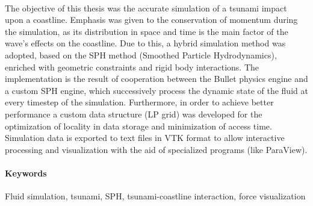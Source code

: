 \paragraph{} The objective of this thesis was the accurate simulation of a tsunami impact
upon a coastline. Emphasis was given to the conservation of momentum during the
simulation, as its distribution in space and time is the main factor of the wave's effects
on the coastline. Due to this, a hybrid simulation method was adopted, based on the SPH
method (Smoothed Particle Hydrodynamics), enriched with geometric constraints and rigid
body interactions. The implementation is the result of cooperation between the Bullet
physics engine and a custom SPH engine, which successively process the dynamic state of
the fluid at every timestep of the simulation. Furthermore, in order to achieve better
performance a custom data structure (LP grid) was developed for the optimization of
locality in data storage and minimization of access time. Simulation data is exported to
text files in VTK format to allow interactive processing and visualization with the aid of
specialized programs (like ParaView).
\paragraph{Keywords} Fluid simulation, tsunami, SPH, tsunami-coastline interaction,
force visualization

